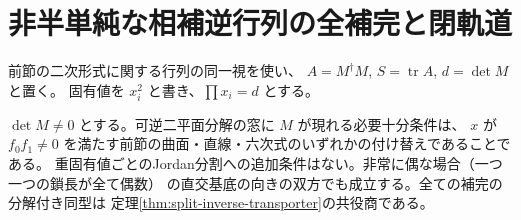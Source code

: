 \section{非半単純な相補逆行列の全補完と閉軌道}
\label{sec:split-jordan-transport}
前節の二次形式に関する行列の同一視を使い、
$A=M^\dagger M$, $S=\operatorname{tr}A$, $d=\det M$ と置く。
固有値を $x_i^2$ と書き、$\prod x_i=d$ とする。
\begin{theorem}\label{thm:split-jordan-transport}
$\det M\ne0$ とする。可逆二平面分解の窓に $M$ が現れる必要十分条件は、
$x$ が $f_0f_1\ne0$ を満たす前節の曲面・直線・六次式のいずれかの付け替えであることである。
重固有値ごとのJordan分割への追加条件はない。非常に偶な場合（一つ一つの鎖長が全て偶数）
の直交基底の向きの双方でも成立する。全ての補完の分解付き同型は
定理\ref{thm:split-inverse-transporter}の共役商である。
\end{theorem}
